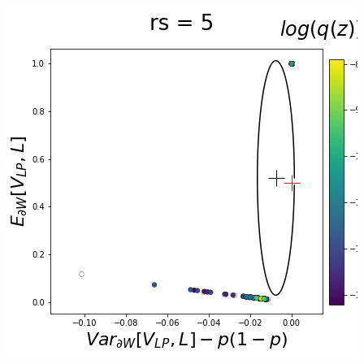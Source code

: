 \documentclass[11pt]{article}
\begin{document}
\begin{center}
\includegraphics[scale=0.33]{figs/T_x_SC_reduced_c=15_p=50_rs=5.png}
\end{center}
\end{document}
